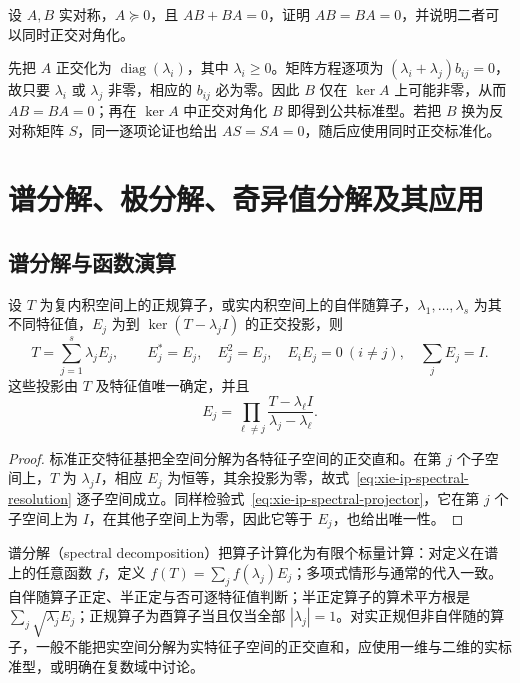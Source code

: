 \begin{example}
设 $A,B$ 实对称，$A\succeq0$，且 $AB+BA=0$，证明 $AB=BA=0$，并说明二者可以同时正交对角化。
\end{example}
\begin{solve}
先把 $A$ 正交化为 $\operatorname{diag}(\lambda_i)$，其中 $\lambda_i\geq0$。矩阵方程逐项为 $(\lambda_i+\lambda_j)b_{ij}=0$，故只要 $\lambda_i$ 或 $\lambda_j$ 非零，相应的 $b_{ij}$ 必为零。因此 $B$ 仅在 $\ker A$ 上可能非零，从而 $AB=BA=0$；再在 $\ker A$ 中正交对角化 $B$ 即得到公共标准型。若把 $B$ 换为反对称矩阵 $S$，同一逐项论证也给出 $AS=SA=0$，随后应使用同时正交标准化。
\end{solve}

\section{谱分解、极分解、奇异值分解及其应用}
\label{sec:xie-ip-decompositions}

\subsection{谱分解与函数演算}

\begin{theorem}
\label{thm:xie-ip-spectral-resolution}
设 $T$ 为复内积空间上的正规算子，或实内积空间上的自伴随算子，$\lambda_1,\ldots,\lambda_s$ 为其不同特征值，$E_j$ 为到 $\ker(T-\lambda_jI)$ 的正交投影，则
\begin{equation}
\label{eq:xie-ip-spectral-resolution}
T=\sum_{j=1}^s\lambda_jE_j,\qquad
E_j^*=E_j,\quad E_j^2=E_j,\quad
E_iE_j=0\ (i\ne j),\quad \sum_jE_j=I.
\end{equation}
这些投影由 $T$ 及特征值唯一确定，并且
\begin{equation}
\label{eq:xie-ip-spectral-projector}
E_j=\prod_{\ell\ne j}\frac{T-\lambda_\ell I}{\lambda_j-\lambda_\ell}.
\end{equation}
\end{theorem}
\begin{proof}
标准正交特征基把全空间分解为各特征子空间的正交直和。在第 $j$ 个子空间上，$T$ 为 $\lambda_jI$，相应 $E_j$ 为恒等，其余投影为零，故式~\eqref{eq:xie-ip-spectral-resolution} 逐子空间成立。同样检验式~\eqref{eq:xie-ip-spectral-projector}，它在第 $j$ 个子空间上为 $I$，在其他子空间上为零，因此它等于 $E_j$，也给出唯一性。
\end{proof}

谱分解（spectral decomposition）把算子计算化为有限个标量计算：对定义在谱上的任意函数 $f$，定义 $f(T)=\sum_jf(\lambda_j)E_j$；多项式情形与通常的代入一致。自伴随算子正定、半正定与否可逐特征值判断；半正定算子的算术平方根是 $\sum_j\sqrt{\lambda_j}E_j$；正规算子为酉算子当且仅当全部 $|\lambda_j|=1$。对实正规但非自伴随的算子，一般不能把实空间分解为实特征子空间的正交直和，应使用一维与二维的实标准型，或明确在复数域中讨论。

